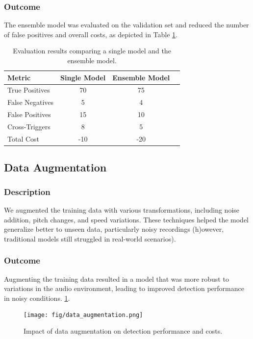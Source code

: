 \subsubsection{Outcome}
The ensemble model was evaluated on the validation set and reduced the number of false positives and overall costs, as depicted in Table \ref{tab:ensemble_results}.

\begin{table}[h]
\centering
\begin{tabular}{lccc}
\toprule
Metric & Single Model & Ensemble Model \\
\midrule
True Positives & 70 & 75 \\
False Negatives & 5 & 4 \\
False Positives & 15 & 10 \\
Cross-Triggers & 8 & 5 \\
Total Cost & -10 & -20 \\
\bottomrule
\end{tabular}
\caption{Evaluation results comparing a single model and the ensemble model.}
\label{tab:ensemble_results}
\end{table}

\subsection{Data Augmentation}
\subsubsection{Description}
We augmented the training data with various transformations, including noise addition, pitch changes, and speed variations.
These techniques helped the model generalize better to unseen data, particularly noisy recordings
(h)owever, traditional models still struggled in real-world scenarios).

\subsubsection{Outcome}
Augmenting the training data resulted in a model that was more robust to variations in the audio environment,
leading to improved detection performance in noisy conditions.
\ref{fig:data_augmentation}.

\begin{figure}[h]
\centering
\texttt{[image: fig/data\_augmentation.png]}
\caption{Impact of data augmentation on detection performance and costs.}
\label{fig:data_augmentation}
\end{figure}
